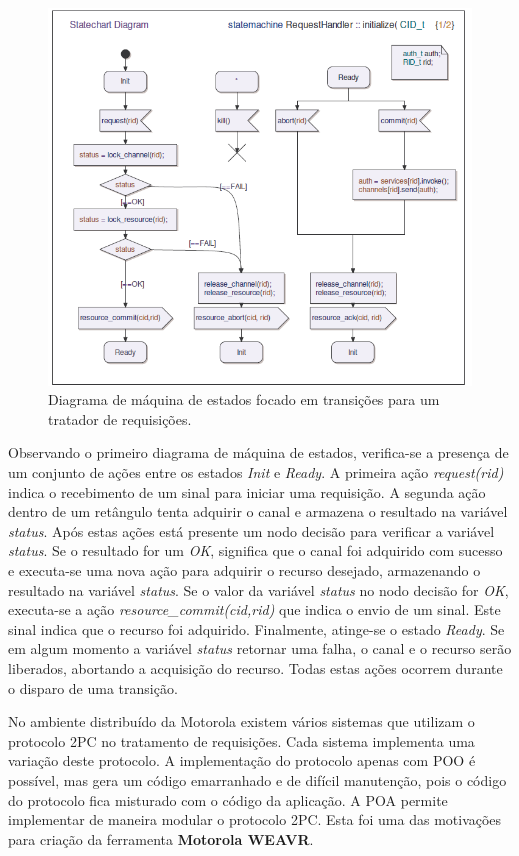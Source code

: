 \begin{figure}
	\centering
	\includegraphics[width=450px]{img/weavr_state_machine_base.png}
	\caption{Diagrama de máquina de estados focado em transições
	para um tratador de requisições.}\label{fig:weavr_state_machine_base}
\end{figure}

Observando o primeiro diagrama de máquina de estados, verifica-se a presença de um conjunto de ações entre os estados \textit{Init} e \textit{Ready}. 
A primeira ação \textit{request(rid)} indica o recebimento de um sinal para iniciar uma requisição. A segunda ação dentro de um retângulo tenta
adquirir o canal e armazena o resultado na variável \textit{status}. Após estas ações está presente um nodo decisão para verificar a variável
\textit{status}. Se o resultado for um \textit{OK}, significa que o canal foi adquirido com sucesso e executa-se uma nova ação para adquirir o recurso
desejado, armazenando o resultado na variável \textit{status}. Se o valor da variável \textit{status} no nodo decisão for \textit{OK}, executa-se a
ação \textit{resource\_commit(cid,rid)} que indica o envio de um sinal. Este sinal indica que o recurso foi adquirido. Finalmente, atinge-se o estado
\textit{Ready}. Se em algum momento a variável \textit{status} retornar uma falha, o canal e o recurso serão liberados, abortando a acquisição do
recurso. Todas estas ações ocorrem durante o disparo de uma transição. 

No ambiente distribuído da Motorola existem vários sistemas que utilizam o protocolo 2PC no tratamento de requisições. Cada sistema implementa uma
variação deste protocolo. A implementação do protocolo apenas com POO é possível, mas gera um código emarranhado e de difícil manutenção, pois o
código do protocolo fica misturado com o código da aplicação. A POA permite implementar de maneira modular o protocolo 2PC. Esta foi uma das
motivações para criação da ferramenta \textbf{Motorola WEAVR}. 

